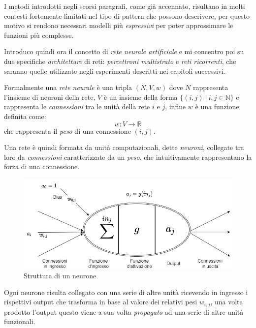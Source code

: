 \documentclass[../../main.tex]{subfiles}
\begin{document}
I metodi introdotti negli scorsi paragrafi, come già accennato, risultano in molti contesti fortemente limitati nel tipo di pattern che possono descrivere, per questo motivo si rendono necessari modelli più \textit{espressivi} per poter approssimare le funzioni più complesse.

Introduco quindi ora il concetto di \textit{rete neurale artificiale} e mi concentro poi su due specifiche \textit{architetture} di reti: \textit{percettroni multistrato} e \textit{reti ricorrenti}, che saranno quelle utilizzate negli esperimenti descritti nei capitoli successivi.  

Formalmente una \textit{rete neurale} è una tripla $(N, V, w)$ dove $N$ rappresenta l'insieme di neuroni della rete, $V$ è un insieme della forma $\{(i, j) \ | \ i,j \in \mathbb{N} \}$ e rappresenta le \textit{connessioni} tra le unità della rete $i$ e $j$, infine $w$ è una funzione definita come:
\[w : V \rightarrow \mathbb{R}\]
che rappresenta il \textit{peso} di una connessione $(i, j)$. \cite{kriesel2007bin}

Una rete è quindi formata da unità computazionali, dette \textit{neuroni}, collegate tra loro da \textit{connessioni} caratterizzate da un \textit{peso}, che intuitivamente rappresentano la forza di una connessione.

\begin{figure}[H]
    \centering
    \includegraphics[width=\textwidth]{immagini/4_2/neuron.png}
    \caption{Struttura di un neurone}
    \label{fig:neuron}
\end{figure}

Ogni neurone risulta collegato con una serie di altre unità ricevendo in ingresso i rispettivi output che trasforma in base al valore dei relativi pesi $w_{i,j}$, una volta prodotto l'output questo viene a sua volta \textit{propagato} ad una serie di altre unità funzionali.
\end{document}
